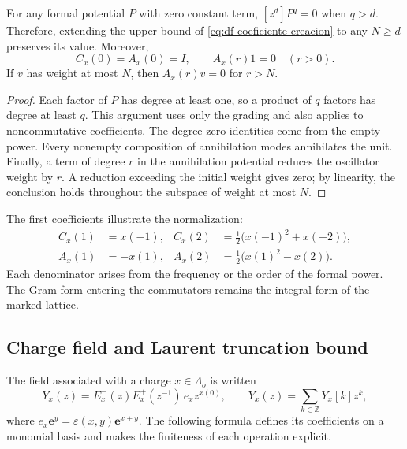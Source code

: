 \begin{lemma}
\label{lem:df-estabilizacion} For any formal potential \(P\) with zero constant term, \([z^d]P^q=0\) when \(q>d\). Therefore, extending the upper bound of \eqref{eq:df-coeficiente-creacion} to any \(N\geq d\) preserves its value. Moreover,
\[
 C_x(0)=A_x(0)=I,
 \qquad A_x(r)1=0\quad(r>0).
\]
If \(v\) has weight at most \(N\), then \(A_x(r)v=0\) for \(r>N\).
\end{lemma}

\begin{proof}
Each factor of \(P\) has degree at least one, so a product of \(q\) factors has degree at least \(q\). This argument uses only the grading and also applies to noncommutative coefficients. The degree-zero identities come from the empty power. Every nonempty composition of annihilation modes annihilates the unit. Finally, a term of degree \(r\) in the annihilation potential reduces the oscillator weight by \(r\). A reduction exceeding the initial weight gives zero; by linearity, the conclusion holds throughout the subspace of weight at most \(N\).
\end{proof}

The first coefficients illustrate the normalization:
\begin{align*}
 C_x(1)&=x(-1),&
 C_x(2)&=\tfrac12\bigl(x(-1)^2+x(-2)\bigr),\\
 A_x(1)&=-x(1),&
 A_x(2)&=\tfrac12\bigl(x(1)^2-x(2)\bigr).
\end{align*}
Each denominator arises from the frequency or the order of the formal power. The Gram form entering the commutators remains the integral form of the marked lattice.

\subsection{Charge field and Laurent truncation bound}
\label{subsec:df-campo-carga}


The field associated with a charge \(x\in\Lambda_o\) is written
\begin{equation}
 Y_x(z)=E^-_x(z)E^+_x(z^{-1})\,e_x z^{x(0)},
 \qquad Y_x(z)=\sum_{k\in\mathbb Z}Y_x[k]z^k,
 \label{eq:df-campo}
\end{equation}
where \(e_x\mathbf e^y=\varepsilon(x,y)\mathbf e^{x+y}\). The following formula defines its coefficients on a monomial basis and makes the finiteness of each operation explicit.

